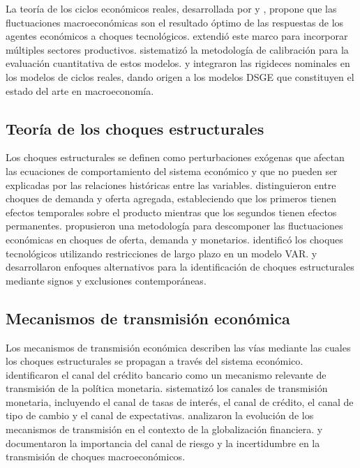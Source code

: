 \documentclass[12pt,a4paper]{article}
\begin{document}
La teoría de los ciclos económicos reales, desarrollada por \citet{kydland1982} y \citet{plosser1983}, propone que las fluctuaciones macroeconómicas son el resultado óptimo de las respuestas de los agentes económicos a choques tecnológicos. \citet{long1983} extendió este marco para incorporar múltiples sectores productivos. \citet{cooley1995} sistematizó la metodología de calibración para la evaluación cuantitativa de estos modelos. \citet{king1999} y \citet{christiano2005} integraron las rigideces nominales en los modelos de ciclos reales, dando origen a los modelos DSGE que constituyen el estado del arte en macroeconomía.

\subsection{Teoría de los choques estructurales}

Los choques estructurales se definen como perturbaciones exógenas que afectan las ecuaciones de comportamiento del sistema económico y que no pueden ser explicadas por las relaciones históricas entre las variables. \citet{blanchard1992} distinguieron entre choques de demanda y oferta agregada, estableciendo que los primeros tienen efectos temporales sobre el producto mientras que los segundos tienen efectos permanentes. \citet{shapiro1987} propusieron una metodología para descomponer las fluctuaciones económicas en choques de oferta, demanda y monetarios. \citet{gali1999} identificó los choques tecnológicos utilizando restricciones de largo plazo en un modelo VAR. \citet{christiano2006} y \citet{favero2010} desarrollaron enfoques alternativos para la identificación de choques estructurales mediante signos y exclusiones contemporáneas.

\subsection{Mecanismos de transmisión económica}

Los mecanismos de transmisión económica describen las vías mediante las cuales los choques estructurales se propagan a través del sistema económico. \citet{bernanke1992} identificaron el canal del crédito bancario como un mecanismo relevante de transmisión de la política monetaria. \citet{mishkin1996} sistematizó los canales de transmisión monetaria, incluyendo el canal de tasas de interés, el canal de crédito, el canal de tipo de cambio y el canal de expectativas. \citet{boivin2010} analizaron la evolución de los mecanismos de transmisión en el contexto de la globalización financiera. \citet{gertler2018} y \citet{woodford2019} documentaron la importancia del canal de riesgo y la incertidumbre en la transmisión de choques macroeconómicos.
\end{document}
